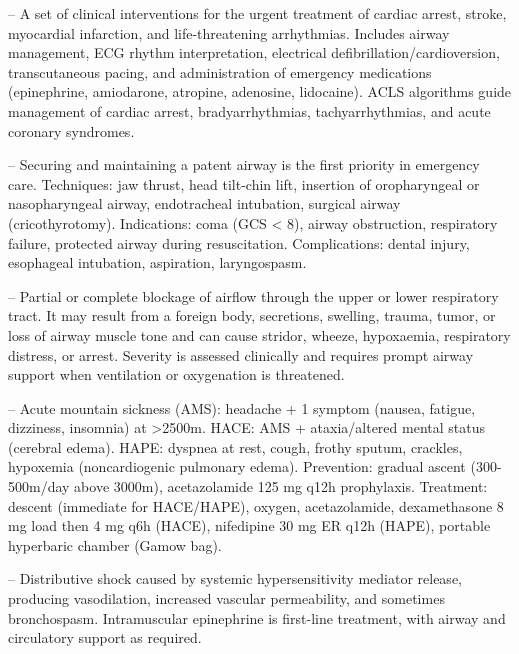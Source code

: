 -- A set of clinical interventions for the urgent treatment of cardiac arrest, stroke, myocardial infarction, and life-threatening arrhythmias. Includes airway management, ECG rhythm interpretation, electrical defibrillation/cardioversion, transcutaneous pacing, and administration of emergency medications (epinephrine, amiodarone, atropine, adenosine, lidocaine). ACLS algorithms guide management of cardiac arrest, bradyarrhythmias, tachyarrhythmias, and acute coronary syndromes.

-- Securing and maintaining a patent airway is the first priority in emergency care. Techniques: jaw thrust, head tilt-chin lift, insertion of oropharyngeal or nasopharyngeal airway, endotracheal intubation, surgical airway (cricothyrotomy). Indications: coma (GCS < 8), airway obstruction, respiratory failure, protected airway during resuscitation. Complications: dental injury, esophageal intubation, aspiration, laryngospasm.

-- Partial or complete blockage of airflow through the upper or lower respiratory tract. It may result from a foreign body, secretions, swelling, trauma, tumor, or loss of airway muscle tone and can cause stridor, wheeze, hypoxaemia, respiratory distress, or arrest. Severity is assessed clinically and requires prompt airway support when ventilation or oxygenation is threatened.

-- Acute mountain sickness (AMS): headache + 1 symptom (nausea, fatigue, dizziness, insomnia) at >2500m. HACE: AMS + ataxia/altered mental status (cerebral edema). HAPE: dyspnea at rest, cough, frothy sputum, crackles, hypoxemia (noncardiogenic pulmonary edema). Prevention: gradual ascent (300-500m/day above 3000m), acetazolamide 125 mg q12h prophylaxis. Treatment: descent (immediate for HACE/HAPE), oxygen, acetazolamide, dexamethasone 8 mg load then 4 mg q6h (HACE), nifedipine 30 mg ER q12h (HAPE), portable hyperbaric chamber (Gamow bag).

-- Distributive shock caused by systemic hypersensitivity mediator release, producing vasodilation, increased vascular permeability, and sometimes bronchospasm. Intramuscular epinephrine is first-line treatment, with airway and circulatory support as required.

